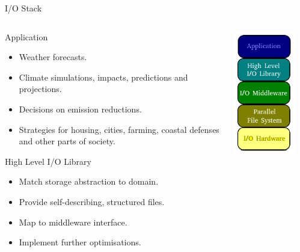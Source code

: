 \documentclass[compress,11pt,xcolor=svgnames,aspectratio=169]{beamer}
\begin{document}
\begin{frame}[fragile]{I/O Stack}

{\tiny

\begin{columns}
\begin{column}{0.38\textwidth}
\begin{block}{Application}
\begin{itemize}
\item Weather forecasts.
\item Climate simulations, impacts, predictions and projections.
\item Decisions on emission reductions.
\item Strategies for housing, cities, farming, coastal defenses and other parts of society.
\end{itemize}
\end{block}
\begin{block}{High Level I/O Library}
\begin{itemize}
\item Match storage abstraction to domain.
\item Provide self-describing, structured files.
\item Map to middleware interface.
\item Implement further optimisations.
\end{itemize}
\end{block}
\end{column}
\begin{column}{0.24\textwidth}
\begin{center}
\includegraphics[scale=0.8]{fig/io-stack}
\end{center}
\end{column}
\begin{column}{0.38\textwidth}

\end{column}
\end{columns}}
\end{frame}
\end{document}
